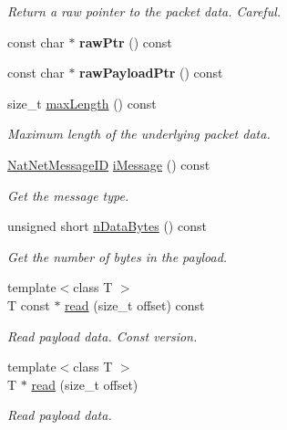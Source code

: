 \begin{DoxyCompactItemize}
\begin{DoxyCompactList}\small\item\em \-Return a raw pointer to the packet data. \-Careful. \end{DoxyCompactList}\item 
\hypertarget{classNatNetPacket_ad95192c9fc7688d73b293b8b4e49de6c}{const char $\ast$ {\bfseries raw\-Ptr} () const }\label{classNatNetPacket_ad95192c9fc7688d73b293b8b4e49de6c}

\item 
\hypertarget{classNatNetPacket_ac4a953155e583f92166cb2fc2231e130}{const char $\ast$ {\bfseries raw\-Payload\-Ptr} () const }\label{classNatNetPacket_ac4a953155e583f92166cb2fc2231e130}

\item 
size\-\_\-t \hyperlink{classNatNetPacket_a2995d658809ef76680d783c8dbb11fbb}{max\-Length} () const 
\begin{DoxyCompactList}\small\item\em \-Maximum length of the underlying packet data. \end{DoxyCompactList}\item 
\hypertarget{classNatNetPacket_a07aa64d7f8db5bd5469879ae87918c92}{\hyperlink{classNatNetPacket_af9a3198d39270f9703a36c414079ab51}{\-Nat\-Net\-Message\-I\-D} \hyperlink{classNatNetPacket_a07aa64d7f8db5bd5469879ae87918c92}{i\-Message} () const }\label{classNatNetPacket_a07aa64d7f8db5bd5469879ae87918c92}

\begin{DoxyCompactList}\small\item\em \-Get the message type. \end{DoxyCompactList}\item 
\hypertarget{classNatNetPacket_aff2c08650945030907a0fcc5c11c2b84}{unsigned short \hyperlink{classNatNetPacket_aff2c08650945030907a0fcc5c11c2b84}{n\-Data\-Bytes} () const }\label{classNatNetPacket_aff2c08650945030907a0fcc5c11c2b84}

\begin{DoxyCompactList}\small\item\em \-Get the number of bytes in the payload. \end{DoxyCompactList}\item 
{\footnotesize template$<$class T $>$ }\\\-T const $\ast$ \hyperlink{classNatNetPacket_aa88263f0c7c59be19b1ca22b2b0df8e3}{read} (size\-\_\-t offset) const 
\begin{DoxyCompactList}\small\item\em \-Read payload data. \-Const version. \end{DoxyCompactList}\item 
{\footnotesize template$<$class T $>$ }\\\-T $\ast$ \hyperlink{classNatNetPacket_a69c4890244314ffb4362e2e3476e23aa}{read} (size\-\_\-t offset)
\begin{DoxyCompactList}\small\item\em \-Read payload data. \end{DoxyCompactList}\end{DoxyCompactItemize}
